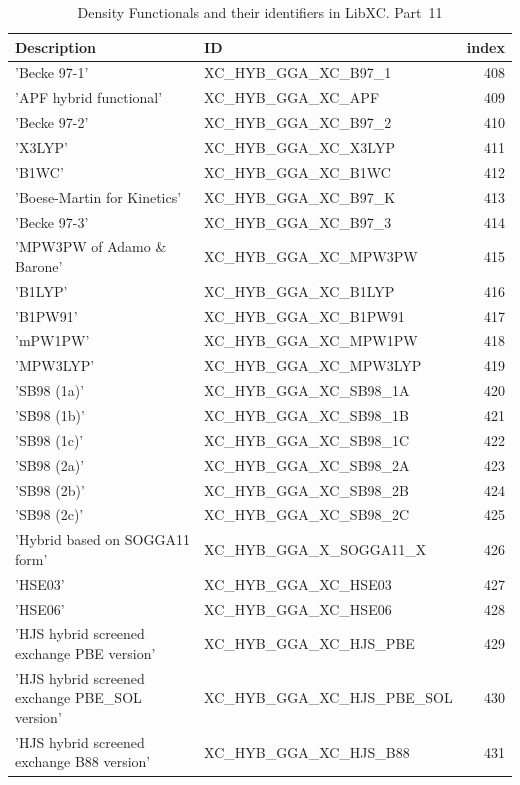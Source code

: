 \documentclass[final,12pt,makeidx,DIV=calc]{article}
\begin{document}
{{{\begin{table}[!h]
\caption{Density Functionals and their identifiers in LibXC. Part~11}
\begin{center}
\begin{tabular}{llr}
\hline
\hline
Description & ID & index\\
\hline
  'Becke 97-1' & XC\_HYB\_GGA\_XC\_B97\_1  &408\\
  'APF hybrid functional' & XC\_HYB\_GGA\_XC\_APF  &409\\
  'Becke 97-2' & XC\_HYB\_GGA\_XC\_B97\_2  &410\\
  'X3LYP' & XC\_HYB\_GGA\_XC\_X3LYP  &411\\
  'B1WC' & XC\_HYB\_GGA\_XC\_B1WC  &412\\
  'Boese-Martin for Kinetics' & XC\_HYB\_GGA\_XC\_B97\_K  &413\\
  'Becke 97-3' & XC\_HYB\_GGA\_XC\_B97\_3  &414\\
  'MPW3PW of Adamo \& Barone' & XC\_HYB\_GGA\_XC\_MPW3PW  &415\\
  'B1LYP' & XC\_HYB\_GGA\_XC\_B1LYP  &416\\
  'B1PW91' & XC\_HYB\_GGA\_XC\_B1PW91  &417\\
  'mPW1PW' & XC\_HYB\_GGA\_XC\_MPW1PW  &418\\
  'MPW3LYP' & XC\_HYB\_GGA\_XC\_MPW3LYP  &419\\
  'SB98 (1a)' & XC\_HYB\_GGA\_XC\_SB98\_1A  &420\\
  'SB98 (1b)' & XC\_HYB\_GGA\_XC\_SB98\_1B  &421\\
  'SB98 (1c)' & XC\_HYB\_GGA\_XC\_SB98\_1C  &422\\
  'SB98 (2a)' & XC\_HYB\_GGA\_XC\_SB98\_2A  &423\\
  'SB98 (2b)' & XC\_HYB\_GGA\_XC\_SB98\_2B  &424\\
  'SB98 (2c)' & XC\_HYB\_GGA\_XC\_SB98\_2C  &425\\
  'Hybrid based on SOGGA11 form' & XC\_HYB\_GGA\_X\_SOGGA11\_X  &426\\
  'HSE03' & XC\_HYB\_GGA\_XC\_HSE03  &427\\
  'HSE06' & XC\_HYB\_GGA\_XC\_HSE06  &428\\
  'HJS hybrid screened exchange PBE version' & XC\_HYB\_GGA\_XC\_HJS\_PBE  &429\\
  'HJS hybrid screened exchange PBE\_SOL version' & XC\_HYB\_GGA\_XC\_HJS\_PBE\_SOL  &430\\
  'HJS hybrid screened exchange B88 version' & XC\_HYB\_GGA\_XC\_HJS\_B88  &431\\

\end{tabular}
\end{center}
\end{table}}}}
\end{document}
